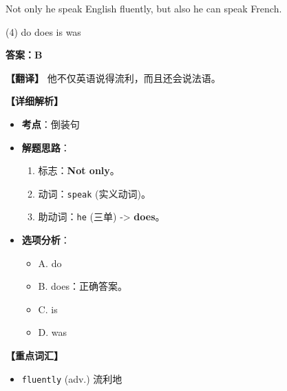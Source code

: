 \documentclass[11pt, a4paper]{article}
\newcommand{\analysis}[4]{
    \begin{solutionbox}
        \textbf{答案：#1}
        
        \textbf{【翻译】} #2
        
        \textbf{【详细解析】}
        #3
        
        \textbf{【重点词汇】}
        #4
    \end{solutionbox}
}
\newcommand{\blank}{\underline{\hspace{1.5cm}}}
\begin{document}
\begin{questions}
    \item Not only \blank he speak English fluently, but also he can speak French.
    \begin{tasks}(4)
        \task do \task does \task is \task was
    \end{tasks}
    \analysis{B}{他不仅英语说得流利，而且还会说法语。}{
        \begin{itemize}
            \item \textbf{考点}：倒装句
            \item \textbf{解题思路}：
                \begin{enumerate}
                    \item 标志：\textbf{Not only}。
                    \item 动词：\texttt{speak} (实义动词)。
                    \item 助动词：\texttt{he} (三单) -> \textbf{does}。
                \end{enumerate}
            \item \textbf{选项分析}：
                \begin{itemize}
                    \item A. do
                    \item B. does：正确答案。
                    \item C. is
                    \item D. was
                \end{itemize}
        \end{itemize}
    }{
        \begin{itemize}
            \item \texttt{fluently} (adv.) 流利地
        \end{itemize}
    }


\end{questions}
\end{document}
